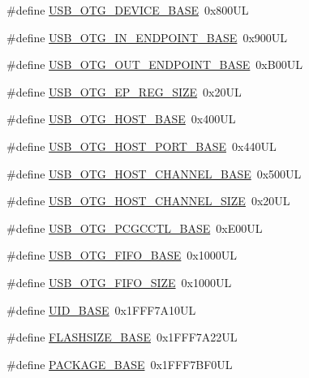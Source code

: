 \begin{DoxyCompactItemize}
\item 
\#define \hyperlink{group___peripheral__memory__map_ga4d74a337597a77b1fca978202b519a18}{U\+S\+B\+\_\+\+O\+T\+G\+\_\+\+D\+E\+V\+I\+C\+E\+\_\+\+B\+A\+SE}~0x800\+UL
\item 
\#define \hyperlink{group___peripheral__memory__map_gad8f69041452615aeb3948600e3882246}{U\+S\+B\+\_\+\+O\+T\+G\+\_\+\+I\+N\+\_\+\+E\+N\+D\+P\+O\+I\+N\+T\+\_\+\+B\+A\+SE}~0x900\+UL
\item 
\#define \hyperlink{group___peripheral__memory__map_gaf0e972b8f028ecf44a652029efbd4642}{U\+S\+B\+\_\+\+O\+T\+G\+\_\+\+O\+U\+T\+\_\+\+E\+N\+D\+P\+O\+I\+N\+T\+\_\+\+B\+A\+SE}~0x\+B00\+UL
\item 
\#define \hyperlink{group___peripheral__memory__map_ga6fdb7429ad88e2d69440d6ecc4f4199e}{U\+S\+B\+\_\+\+O\+T\+G\+\_\+\+E\+P\+\_\+\+R\+E\+G\+\_\+\+S\+I\+ZE}~0x20\+UL
\item 
\#define \hyperlink{group___peripheral__memory__map_ga3bb2dd6c82eefd8587b6146ba36ae071}{U\+S\+B\+\_\+\+O\+T\+G\+\_\+\+H\+O\+S\+T\+\_\+\+B\+A\+SE}~0x400\+UL
\item 
\#define \hyperlink{group___peripheral__memory__map_ga42f433cb79ca69f09972e690fda6737a}{U\+S\+B\+\_\+\+O\+T\+G\+\_\+\+H\+O\+S\+T\+\_\+\+P\+O\+R\+T\+\_\+\+B\+A\+SE}~0x440\+UL
\item 
\#define \hyperlink{group___peripheral__memory__map_ga942c8c5241b80fbcf638fea0fa18bebd}{U\+S\+B\+\_\+\+O\+T\+G\+\_\+\+H\+O\+S\+T\+\_\+\+C\+H\+A\+N\+N\+E\+L\+\_\+\+B\+A\+SE}~0x500\+UL
\item 
\#define \hyperlink{group___peripheral__memory__map_ga266cb1dbb50faf447f9c15d2ee93a522}{U\+S\+B\+\_\+\+O\+T\+G\+\_\+\+H\+O\+S\+T\+\_\+\+C\+H\+A\+N\+N\+E\+L\+\_\+\+S\+I\+ZE}~0x20\+UL
\item 
\#define \hyperlink{group___peripheral__memory__map_gaa9766975aca084c257730879568bc7cf}{U\+S\+B\+\_\+\+O\+T\+G\+\_\+\+P\+C\+G\+C\+C\+T\+L\+\_\+\+B\+A\+SE}~0x\+E00\+UL
\item 
\#define \hyperlink{group___peripheral__memory__map_gace340350802904868673f0e839c4fa04}{U\+S\+B\+\_\+\+O\+T\+G\+\_\+\+F\+I\+F\+O\+\_\+\+B\+A\+SE}~0x1000\+UL
\item 
\#define \hyperlink{group___peripheral__memory__map_ga8781c4b2406c740d9fe540737a6a0188}{U\+S\+B\+\_\+\+O\+T\+G\+\_\+\+F\+I\+F\+O\+\_\+\+S\+I\+ZE}~0x1000\+UL
\item 
\#define \hyperlink{group___peripheral__memory__map_ga664eda42b83c919b153b07b23348be67}{U\+I\+D\+\_\+\+B\+A\+SE}~0x1\+F\+F\+F7\+A10\+UL
\item 
\#define \hyperlink{group___peripheral__memory__map_ga776d985f2d4d40b588ef6ca9d573af78}{F\+L\+A\+S\+H\+S\+I\+Z\+E\+\_\+\+B\+A\+SE}~0x1\+F\+F\+F7\+A22\+UL
\item 
\#define \hyperlink{group___peripheral__memory__map_ga88fc8a2912bd1ac72c6eddb456f0b096}{P\+A\+C\+K\+A\+G\+E\+\_\+\+B\+A\+SE}~0x1\+F\+F\+F7\+B\+F0\+UL
\end{DoxyCompactItemize}


